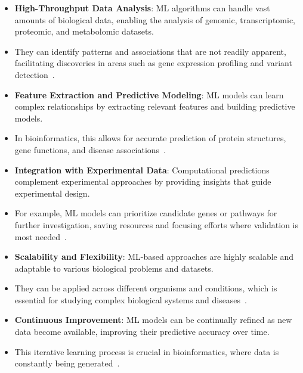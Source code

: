    \begin{itemize}
      \item \textbf{High-Throughput Data Analysis}: ML algorithms can handle vast amounts of biological data, enabling the analysis of genomic, transcriptomic, proteomic, and metabolomic datasets.
      \item They can identify patterns and associations that are not readily apparent, facilitating discoveries in areas such as gene expression profiling and variant detection~\cite{libbrecht_machine_2015}.

      \item \textbf{Feature Extraction and Predictive Modeling}: ML models can learn complex relationships by extracting relevant features and building predictive models.
      \item In bioinformatics, this allows for accurate prediction of protein structures, gene functions, and disease associations~\cite{chicco_machine_2020}.

      \item \textbf{Integration with Experimental Data}: Computational predictions complement experimental approaches by providing insights that guide experimental design.
      \item For example, ML models can prioritize candidate genes or pathways for further investigation, saving resources and focusing efforts where validation is most needed~\cite{larranaga_machine_2006}.

      \item \textbf{Scalability and Flexibility}: ML-based approaches are highly scalable and adaptable to various biological problems and datasets.
      \item They can be applied across different organisms and conditions, which is essential for studying complex biological systems and diseases~\cite{min_deep_2016}.

      \item \textbf{Continuous Improvement}: ML models can be continually refined as new data become available, improving their predictive accuracy over time.
      \item This iterative learning process is crucial in bioinformatics, where data is constantly being generated~\cite{esteva_guide_2019}.
    \end{itemize}
